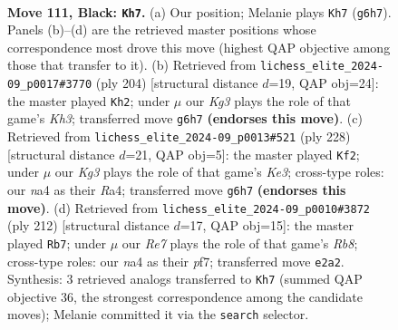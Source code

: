 \documentclass[11pt]{article}
\begin{document}
\clearpage

\begin{figure}[p]\centering
\begin{subfigure}{0.46\textwidth}\centering
\resizebox{\linewidth}{!}{%
\newchessgame
\chessboard[
  setfen={8/R5p1/5pk1/7p/N6P/6PK/4r3/8 b - - 47 111},
  showmover=false,
  pgfstyle=straightmove, color=movearrow, markmove={g6-h7}
]}
\caption{}
\end{subfigure}\hfill
\begin{subfigure}{0.46\textwidth}\centering
\resizebox{\linewidth}{!}{%
\newchessgame
\chessboard[
  setfen={8/5R2/6pk/7p/7P/1r4PK/8/8 w - - 42 103},
  showmover=false,
  pgfstyle=straightmove, color=movearrow, markmove={h3-h2}
]}
\caption{}
\end{subfigure}
\\[4pt]
\begin{subfigure}{0.46\textwidth}\centering
\resizebox{\linewidth}{!}{%
\newchessgame
\chessboard[
  setfen={8/4r3/6pk/7p/R6P/4KPP1/8/8 w - - 39 115},
  showmover=false,
  pgfstyle=straightmove, color=movearrow, markmove={e3-f2}
]}
\caption{}
\end{subfigure}\hfill
\begin{subfigure}{0.46\textwidth}\centering
\resizebox{\linewidth}{!}{%
\newchessgame
\chessboard[
  setfen={1R6/5pk1/6p1/4P2p/5K1P/5PP1/8/4r3 w - - 5 107},
  showmover=false,
  pgfstyle=straightmove, color=movearrow, markmove={b8-b7}
]}
\caption{}
\end{subfigure}
\caption{\textbf{Move 111, Black: \texttt{Kh7}.} (a) Our position; Melanie plays \texttt{Kh7} (\texttt{g6h7}). Panels (b)--(d) are the retrieved master positions whose correspondence most drove this move (highest QAP objective among those that transfer to it). (b) Retrieved from \texttt{lichess\_elite\_2024-09\_p0017\#3770} (ply 204) [structural distance $d$=19, QAP obj=24]: the master played \texttt{Kh2}; under $\mu$ our \emph{Kg3} plays the role of that game's \emph{Kh3}; transferred move \texttt{g6h7} \textbf{(endorses this move)}. (c) Retrieved from \texttt{lichess\_elite\_2024-09\_p0013\#521} (ply 228) [structural distance $d$=21, QAP obj=5]: the master played \texttt{Kf2}; under $\mu$ our \emph{Kg3} plays the role of that game's \emph{Ke3}; cross-type roles: our \emph{n}a4 as their \emph{R}a4; transferred move \texttt{g6h7} \textbf{(endorses this move)}. (d) Retrieved from \texttt{lichess\_elite\_2024-09\_p0010\#3872} (ply 212) [structural distance $d$=17, QAP obj=15]: the master played \texttt{Rb7}; under $\mu$ our \emph{Re7} plays the role of that game's \emph{Rb8}; cross-type roles: our \emph{n}a4 as their \emph{p}f7; transferred move \texttt{e2a2}. Synthesis: 3 retrieved analogs transferred to \texttt{Kh7} (summed QAP objective 36, the strongest correspondence among the candidate moves); Melanie committed it via the \texttt{search} selector.}
\label{fig:thought-m221}
\end{figure}
\end{document}
